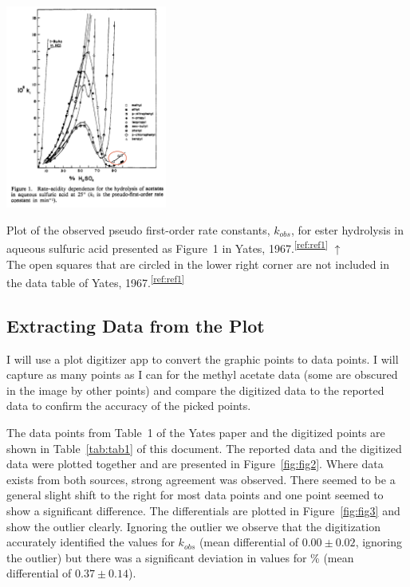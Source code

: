 \documentclass[]{tufte-handout}
\newcommand{\tss}[1]{\textsuperscript{#1}}
\begin{document}
\begin{marginfigure}[0mm]
  \centering
  \includegraphics[width=150pt]{images/Yates-McClelland-1967-F1.png}
  \caption[0mm]{Plot of the observed pseudo first-order rate constants, $k_{obs}$, for ester hydrolysis in aqueous sulfuric acid presented as Figure~1 in Yates, 1967.\tss{\ref{ref:ref1}}  $\uparrow$ \\ The open squares that are circled in the lower right corner are not included in the data table of Yates, 1967.\tss{\ref{ref:ref1}}  \vspace{3mm}}
  \label{fig:fig1}
\end{marginfigure}

\subsection{Extracting Data from the Plot}
I will use a plot digitizer app to convert the graphic points to data points. I will capture as many points as I can for the methyl acetate data (some are obscured in the image by other points) and compare the digitized data to the reported data to confirm the accuracy of the picked points.

The data points from Table~1 of the Yates paper and the digitized points are shown in Table~\vref{tab:tab1} of this document. The reported data and the digitized data were plotted together and are presented in Figure~\ref{fig:fig2}. Where data exists from both sources, strong agreement was observed. There seemed to be a general slight shift to the right for most data points and one point seemed to show a significant difference. The differentials are plotted in Figure~\ref{fig:fig3} and show the outlier clearly. Ignoring the outlier we observe that the digitization accurately identified the values for $k_{obs}$ (mean differential of $0.00 \pm 0.02$, ignoring the outlier) but there was a significant deviation in values for \% (mean differential of $0.37 \pm 0.14$).
\end{document}
